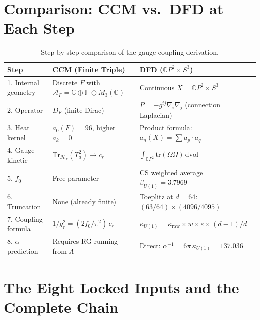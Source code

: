 \documentclass[12pt,a4paper]{article}
\begin{document}
\section{Comparison: CCM vs.\ DFD at Each Step}
\label{sec:comparison}

\begin{table}[h]
\centering
\caption{Step-by-step comparison of the gauge coupling derivation.}
\label{tab:comparison}
\renewcommand{\arraystretch}{1.4}
\small
\begin{tabular}{p{3.2cm}p{5cm}p{5cm}}
\toprule
\textbf{Step} & \textbf{CCM (Finite Triple)} & \textbf{DFD ($\mathbb{C}P^2 \times S^3$)} \\
\midrule
1. Internal geometry &
  Discrete $F$ with $\mathcal{A}_F = \mathbb{C} \oplus \mathbb{H} \oplus M_3(\mathbb{C})$ &
  Continuous $X = \mathbb{C}P^2 \times S^3$ \\
2. Operator &
  $D_F$ (finite Dirac) &
  $P = -g^{ij}\nabla_i\nabla_j$ (connection Laplacian) \\
3. Heat kernel &
  $a_0(F) = 96$, higher $a_k = 0$ &
  Product formula: $a_n(X) = \sum a_p \cdot a_q$ \\
4. Gauge kinetic &
  $\mathrm{Tr}_{\mathcal{H}_F}(T_a^2) \to c_r$ &
  $\int_{\mathbb{C}P^2}\mathrm{tr}(\Omega\Omega)\,\mathrm{dvol}$ \\
5. $f_0$ &
  Free parameter &
  CS weighted average $\beta_{U(1)} = 3.7969$ \\
6. Truncation &
  None (already finite) &
  Toeplitz at $d = 64$: $(63/64) \times (4096/4095)$ \\
7. Coupling formula &
  $1/g_r^2 = (2f_0/\pi^2)\,c_r$ &
  $\kappa_{U(1)} = \kappa_{\mathrm{raw}} \times w \times \varepsilon \times (d{-}1)/d$ \\
8. $\alpha$ prediction &
  Requires RG running from $\Lambda$ &
  Direct: $\alpha^{-1} = 6\pi\,\kappa_{U(1)} = 137.036$ \\
\bottomrule
\end{tabular}
\end{table}

\section{The Eight Locked Inputs and the Complete Chain}
\label{sec:chain}
\end{document}
